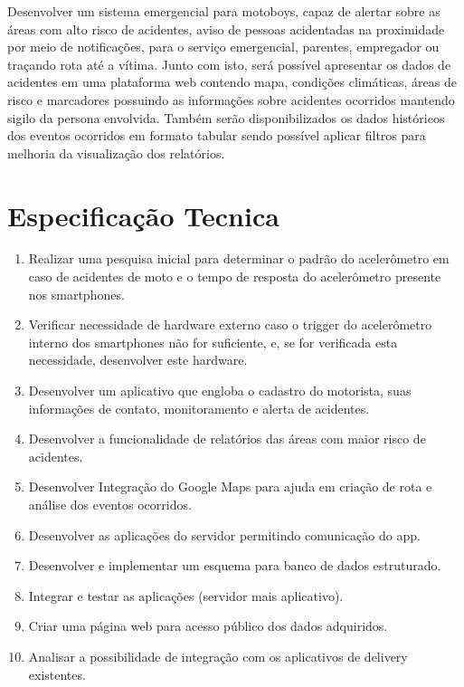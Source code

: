 Desenvolver um sistema emergencial para motoboys, capaz de alertar sobre as áreas com alto risco de acidentes, aviso de pessoas acidentadas na proximidade por meio de notificações, para o serviço emergencial, parentes, empregador ou traçando rota até a vítima.
Junto com isto, será possível apresentar os dados de acidentes em uma plataforma web contendo mapa, condições climáticas, áreas de risco e marcadores possuindo as informações sobre acidentes ocorridos mantendo sigilo da persona envolvida. Também serão disponibilizados os dados históricos dos eventos ocorridos em formato tabular sendo possível aplicar filtros para melhoria da visualização dos relatórios.


\section{Especificação Tecnica}

\begin{enumerate}
    \item Realizar uma pesquisa inicial para determinar o padrão do acelerômetro em caso de acidentes de moto e o tempo de resposta do acelerômetro presente nos smartphones.
\item Verificar necessidade de hardware externo caso o trigger do acelerômetro interno dos smartphones não for suficiente, e, se for verificada esta necessidade, desenvolver este hardware.
\item 	Desenvolver um aplicativo que engloba o cadastro do motorista, suas informações de contato, monitoramento e alerta de acidentes.
\item 	Desenvolver a funcionalidade de relatórios das áreas com maior risco de acidentes.
\item 	Desenvolver Integração do Google Maps para ajuda em criação de rota e análise dos eventos ocorridos.
\item 	Desenvolver as aplicações do servidor permitindo comunicação do app.
\item 	Desenvolver e implementar um esquema para banco de dados estruturado.
\item 	Integrar e testar as aplicações (servidor mais aplicativo).
\item 	Criar uma página web para acesso público dos dados adquiridos.
\item 	Analisar a possibilidade de integração com os aplicativos de delivery existentes.

\end{enumerate}


